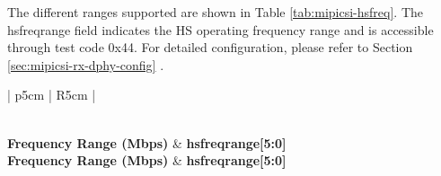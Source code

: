 \documentclass[main\_\_EN.tex]{subfiles}
\begin{document}
The different ranges supported are shown in Table \ref{tab:mipicsi-hsfreq}. The hsfreqrange field indicates the HS operating frequency range and is accessible through test code 0x44. For detailed configuration, please refer to Section \ref{sec:mipicsi-rx-dphy-config} \textit{}.

\begin{longtable}{| p{5cm} | R{5cm} |}
    \caption{Frequency Ranges Supported by MIPI RX D-PHY} \label{tab:mipicsi-hsfreq} \\
    \hline
    \textbf{Frequency Range (Mbps)} & \textbf{hsfreqrange[5:0]} \\ \hline
    \endfirsthead \hline
    \textbf{Frequency Range (Mbps)} & \textbf{hsfreqrange[5:0]} \\ \hline
    \endhead \endfoot \hline \endlastfoot
    

\end{longtable}
\end{document}
